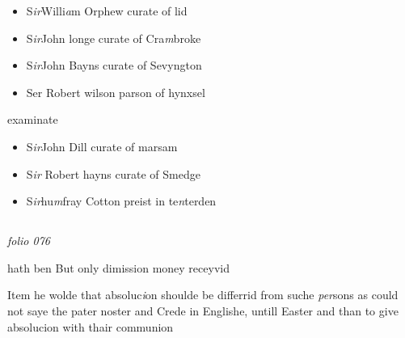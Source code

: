 \documentclass[12pt, a4paper]{book}
\begin{document}
 			
			
               		\begin{itemize}
               			\item[]S\textit{ir}Willi\textit{a}m Orphew curate of lid
               			\item[]S\textit{ir}John longe curate of Cra\textit{m}broke
               			\item[]S\textit{ir}John Bayns curate of Sevyngton
               			\item[]Ser Robert wilson parson of hynxsel
               		\end{itemize}
               		examinate
               		\begin{itemize}
               			\item[]S\textit{ir}John Dill curate of marsam
               			\item[]S\textit{ir} Robert hayns curate of Smedge
               			\item[]S\textit{ir}hu\textit{m}fray Cotton preist in te\textit{n}terden
               		\end{itemize}
               		
 
 



\dotfill
						\newpage {} \subsection*{}  \subsection*{}

\textit{folio 076}



	
		\ifthenelse{\isodd{\thepage}}
		{\reversemarginpar}
		{\normalmarginpar}
		hath ben But only dimission money receyvid
	
		\ifthenelse{\isodd{\thepage}}
		{\reversemarginpar}
		{\normalmarginpar}
		Item he wolde that absoluc\textit{i}on shoulde be differrid from
 suche \textit{per}sons as could not saye the pater noster and
 Crede in Englishe, untill Easter and than to give
 absolucion with thair communion
\end{document}
